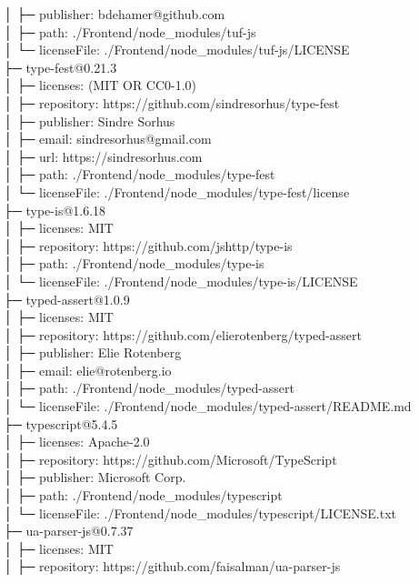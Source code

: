 │  ├─ publisher: bdehamer@github.com\\
│  ├─ path: ./Frontend/node\_modules/tuf-js\\
│  └─ licenseFile: ./Frontend/node\_modules/tuf-js/LICENSE\\
├─ type-fest@0.21.3\\
│  ├─ licenses: (MIT OR CC0-1.0)\\
│  ├─ repository: https://github.com/sindresorhus/type-fest\\
│  ├─ publisher: Sindre Sorhus\\
│  ├─ email: sindresorhus@gmail.com\\
│  ├─ url: https://sindresorhus.com\\
│  ├─ path: ./Frontend/node\_modules/type-fest\\
│  └─ licenseFile: ./Frontend/node\_modules/type-fest/license\\
├─ type-is@1.6.18\\
│  ├─ licenses: MIT\\
│  ├─ repository: https://github.com/jshttp/type-is\\
│  ├─ path: ./Frontend/node\_modules/type-is\\
│  └─ licenseFile: ./Frontend/node\_modules/type-is/LICENSE\\
├─ typed-assert@1.0.9\\
│  ├─ licenses: MIT\\
│  ├─ repository: https://github.com/elierotenberg/typed-assert\\
│  ├─ publisher: Elie Rotenberg\\
│  ├─ email: elie@rotenberg.io\\
│  ├─ path: ./Frontend/node\_modules/typed-assert\\
│  └─ licenseFile: ./Frontend/node\_modules/typed-assert/README.md\\
├─ typescript@5.4.5\\
│  ├─ licenses: Apache-2.0\\
│  ├─ repository: https://github.com/Microsoft/TypeScript\\
│  ├─ publisher: Microsoft Corp.\\
│  ├─ path: ./Frontend/node\_modules/typescript\\
│  └─ licenseFile: ./Frontend/node\_modules/typescript/LICENSE.txt\\
├─ ua-parser-js@0.7.37\\
│  ├─ licenses: MIT\\
│  ├─ repository: https://github.com/faisalman/ua-parser-js\\
